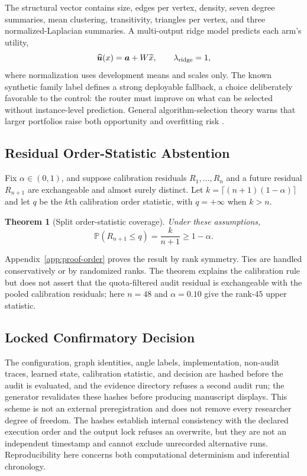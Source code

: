 \documentclass[aps,prx,reprint,superscriptaddress,floatfix]{revtex4-2}
\newtheorem{theorem}{Theorem}[section]
\newcommand{\Pp}{\mathbb{P}}
\begin{document}
The structural vector contains size, edges per vertex, density, seven degree
summaries, mean clustering, transitivity, triangles per vertex, and three
normalized-Laplacian summaries.  A multi-output ridge model predicts each arm's
utility,
\begin{equation}
 \widehat{\bm u}(x)=\bm a+W\widetilde x,
 \qquad \lambda_{\rm ridge}=1,
 \label{eq:ridge}
\end{equation}
where normalization uses development means and scales only.  The known synthetic
family label defines a strong deployable fallback, a choice deliberately
favorable to the control: the router must improve on what can be selected without
instance-level prediction.  General algorithm-selection theory warns that larger
portfolios raise both opportunity and overfitting risk
\citep{rice1976selection,cawley2010overfitting}.

\subsection{Residual Order-Statistic Abstention}

Fix $\alpha\in(0,1)$, and suppose calibration residuals $R_1,\dots,R_n$ and a
future residual $R_{n+1}$ are exchangeable and almost surely distinct.  Let
$k=\lceil(n+1)(1-\alpha)\rceil$ and let $q$ be the $k$th calibration order
statistic, with $q=+\infty$ when $k>n$.

\begin{theorem}[Split order-statistic coverage]
\label{thm:order}
Under these assumptions,
\begin{equation}
 \Pp(R_{n+1}\le q)=\frac{k}{n+1}\ge1-\alpha.
 \label{eq:coverage}
\end{equation}
\end{theorem}

Appendix~\ref{app:proof-order} proves the result by rank symmetry.  Ties are
handled conservatively or by randomized ranks.  The theorem explains the
calibration rule but does not assert that the quota-filtered audit residual is
exchangeable with the pooled calibration residuals; here $n=48$ and
$\alpha=0.10$ give the rank-$45$ upper statistic.

\subsection{Locked Confirmatory Decision}

The configuration, graph identities, angle labels, implementation, non-audit
traces, learned state, calibration statistic, and decision are hashed before the
audit is evaluated, and the evidence directory refuses a second audit run; the
generator revalidates these hashes before producing manuscript displays.  This
scheme is not an external preregistration and does not remove every researcher
degree of freedom.  The hashes establish internal consistency with the declared
execution order and the output lock refuses an overwrite, but they are not an
independent timestamp and cannot exclude unrecorded alternative runs.
Reproducibility here concerns both computational determinism and inferential
chronology.
\end{document}
